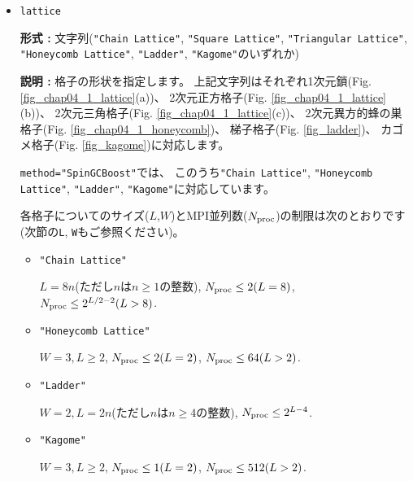 \begin{itemize}
{\bf 形式 :} 文字列(\verb|"Lanczos"|, \verb|"TPQ"|, \verb|"Full Diag"|のいずれか)

{\bf 説明 :} 実行する計算の種類を指定します。
上記の文字列はそれぞれランチョス法による少数固有状態の計算, 
熱力学的純粋状態を用いた有限温度計算, 
直接法による全固有状態計算
に対応します。

\item \verb|lattice|

{\bf 形式 :} 文字列(\verb|"Chain Lattice"|, \verb|"Square Lattice"|, 
\verb|"Triangular Lattice"|, \verb|"Honeycomb Lattice"|, \verb|"Ladder"|, \verb|"Kagome"|のいずれか)

{\bf 説明 :} 格子の形状を指定します。
上記文字列はそれぞれ1次元鎖(Fig. \ref{fig_chap04_1_lattice}(a))、
2次元正方格子(Fig. \ref{fig_chap04_1_lattice}(b))、
2次元三角格子(Fig. \ref{fig_chap04_1_lattice}(c))、
2次元異方的蜂の巣格子(Fig. \ref{fig_chap04_1_honeycomb})、
梯子格子(Fig. \ref{fig_ladder})、
カゴメ格子(Fig. \ref{fig_kagome})に対応します。

\verb|method="SpinGCBoost"|では、
このうち\verb|"Chain Lattice"|, \verb|"Honeycomb Lattice"|, 
\verb|"Ladder"|, \verb|"Kagome"|に対応しています。

各格子についてのサイズ($L$,$W$)とMPI並列数($N_{\rm proc}$)の制限は次のとおりです
(次節の\verb|L|, \verb|W|もご参照ください)。

\begin{itemize}

  \item \verb|"Chain Lattice"|

    $L = 8n$(ただし$n$は$n\geq1$の整数),
    $N_{\rm proc} \leq 2(L=8)$, $N_{\rm proc} \leq 2^{L/2-2}(L>8)$.
    
  \item \verb|"Honeycomb Lattice"|

    $W=3, L \geq 2$, $N_{\rm proc} \leq 2(L=2)$, $N_{\rm proc} \leq 64(L>2)$.

  \item \verb|"Ladder"|

    $W=2, L = 2n$(ただし$n$は$n\geq4$の整数),
    $N_{\rm proc} \leq 2^{L-4}$.

  \item \verb|"Kagome"|

    $W=3, L \geq 2$, $N_{\rm proc} \leq 1(L=2)$, $N_{\rm proc} \leq 512(L>2)$.

\end{itemize}


\end{itemize}
